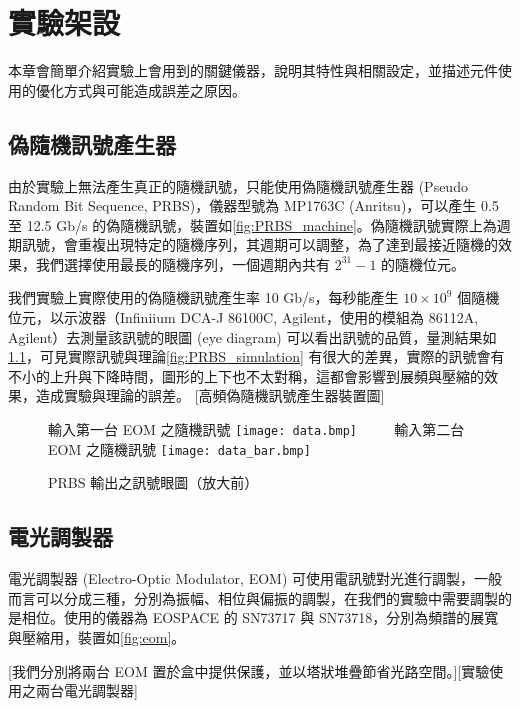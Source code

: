 \documentclass[class=NCU_thesis, crop=false]{standalone}
\begin{document}
\chapter{實驗架設}
本章會簡單介紹實驗上會用到的關鍵儀器，說明其特性與相關設定，並描述元件使用的優化方式與可能造成誤差之原因。

\section{偽隨機訊號產生器}
由於實驗上無法產生真正的隨機訊號，只能使用偽隨機訊號產生器 (Pseudo Random Bit Sequence, PRBS)，儀器型號為 MP1763C (Anritsu)，可以產生 0.5 至 12.5 Gb/s 的偽隨機訊號，裝置如\cref{fig:PRBS_machine}。偽隨機訊號實際上為週期訊號，會重複出現特定的隨機序列，其週期可以調整，為了達到最接近隨機的效果，我們選擇使用最長的隨機序列，一個週期內共有 $2^{31}-1$ 的隨機位元。

我們實驗上實際使用的偽隨機訊號產生率 10 Gb/s，每秒能產生 $10\times 10^{9}$ 個隨機位元，以示波器（Infiniium DCA-J 86100C, Agilent，使用的模組為 86112A, Agilent）去測量該訊號的眼圖 (eye diagram) 可以看出訊號的品質，量測結果如\cref{fig:prbs_eye}，可見實際訊號與理論\cref{fig:PRBS_simulation} 有很大的差異，實際的訊號會有不小的上升與下降時間，圖形的上下也不太對稱，這都會影響到展頻與壓縮的效果，造成實驗與理論的誤差。
[高頻偽隨機訊號產生器裝置圖]


\begin{figure}[!hbt]
    \centering
    \subcaptionbox
        {輸入第一台 EOM 之隨機訊號
        \label{fig:subfig_fig1}}
        {\texttt{[image: data.bmp]}}
    ~~~~
    \subcaptionbox
        {輸入第二台 EOM 之隨機訊號
        \label{fig:subfig_fig2}}
        {\texttt{[image: data\_bar.bmp]}}
    \caption{PRBS 輸出之訊號眼圖（放大前）}
    \label{fig:prbs_eye}
\end{figure}

\section{電光調製器}

電光調製器 (Electro-Optic Modulator, EOM) 可使用電訊號對光進行調製，一般而言可以分成三種，分別為振幅、相位與偏振的調製，在我們的實驗中需要調製的是相位。使用的儀器為 EOSPACE 的 SN73717 與 SN73718，分別為頻譜的展寬與壓縮用，裝置如\cref{fig:eom}。

[我們分別將兩台 EOM 置於盒中提供保護，並以塔狀堆疊節省光路空間。][實驗使用之兩台電光調製器]
\end{document}
